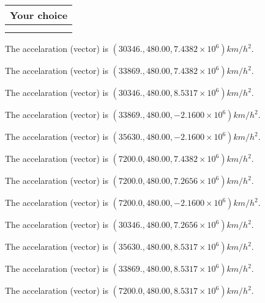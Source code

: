 \documentclass[12pt]{article}
\begin{document}
  
  
\noindent\hspace{3.0in} \begin{tabular}{|l|}
\hline
Your choice \\
\hline
 \\ 
 \\ 
\hline
\end{tabular}
  
  
 
 
The accelaration (vector) is
$(
30346.,
480.00 ,
7.4382 \times 10^{6}
)km/h^2.
$
 
 
The accelaration (vector) is
$(
33869.,
480.00 ,
7.4382 \times 10^{6}
)km/h^2.
$
 
 
The accelaration (vector) is
$(
30346.,
480.00 ,
8.5317 \times 10^{6}
)km/h^2.
$
 
 
The accelaration (vector) is
$(
33869.,
480.00 ,
-2.1600 \times 10^{6}
)km/h^2.
$
 
 
The accelaration (vector) is
$(
35630.,
480.00 ,
-2.1600 \times 10^{6}
)km/h^2.
$
 
 
The accelaration (vector) is
$(
7200.0,
480.00 ,
7.4382 \times 10^{6}
)km/h^2.
$
 
 
The accelaration (vector) is
$(
7200.0,
480.00 ,
7.2656 \times 10^{6}
)km/h^2.
$
 
 
The accelaration (vector) is
$(
7200.0,
480.00 ,
-2.1600 \times 10^{6}
)km/h^2.
$
 
 
The accelaration (vector) is
$(
30346.,
480.00 ,
7.2656 \times 10^{6}
)km/h^2.
$
 
 
The accelaration (vector) is
$(
35630.,
480.00 ,
8.5317 \times 10^{6}
)km/h^2.
$
 
 
The accelaration (vector) is
$(
33869.,
480.00 ,
8.5317 \times 10^{6}
)km/h^2.
$
 
 
The accelaration (vector) is
$(
7200.0,
480.00 ,
8.5317 \times 10^{6}
)km/h^2.
$
 
 
 
 

 
 
\vspace{0.3in}
  
\vspace{0.2in}
  
\end{document}
